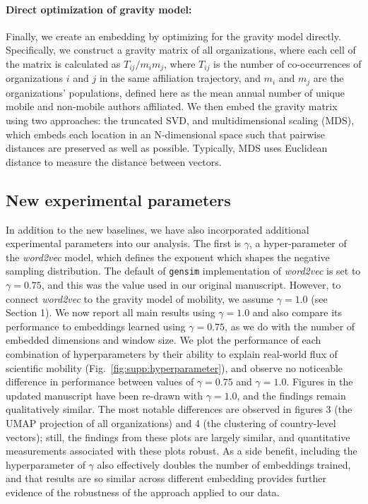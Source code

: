 \documentclass[12pt,a4paper]{article}
\begin{document}
\vspace{-0.3cm}
\paragraph{Direct optimization of gravity model:} Finally, we create an embedding by optimizing for the gravity model directly.
Specifically, we construct a gravity matrix of all organizations, where each cell of the matrix is calculated as $T_{ij}/m_i m_j$, where $T_{ij}$ is the number of co-occurrences of organizations $i$ and $j$ in the same affiliation trajectory, and $m_i$ and $m_j$ are the organizations' populations, defined here as the mean annual number of unique mobile and non-mobile authors affiliated. We then embed the gravity matrix using two approaches: the truncated SVD, and multidimensional scaling (MDS), which embeds each location in an N-dimensional space such that pairwise distances are preserved as well as possible.
Typically, MDS uses Euclidean distance to measure the distance between vectors.

\subsection{New experimental parameters}
In addition to the new baselines, we have also incorporated additional experimental parameters into our analysis.
The first is $\gamma$, a hyper-parameter of the \textit{word2vec} model, which defines the exponent which shapes the negative sampling distribution.
The default of \texttt{gensim} implementation of \textit{word2vec} is set to $\gamma = 0.75$, and this was the value used in our original manuscript.
However, to connect \textit{word2vec} to the gravity model of mobility, we assume $\gamma = 1.0$ (see Section 1).
We now report all main results using $\gamma = 1.0$ and also compare its performance to embeddings learned using $\gamma = 0.75$, as we do with the number of embedded dimensions and window size.
We plot the performance of each combination of hyperparameters by their ability to explain real-world flux of scientific mobility (Fig.~\ref{fig:supp:hyperparameter}), and observe no noticeable difference in performance between values of $\gamma = 0.75$ and $\gamma = 1.0$.
Figures in the updated manuscript have been re-drawn with $\gamma = 1.0$, and the findings remain qualitatively similar.
The most notable differences are observed in figures 3 (the UMAP projection of all organizations) and 4 (the clustering of country-level vectors);
still, the findings from these plots are largely similar, and quantitative measurements associated with these plots robust. 
As a side benefit, including the hyperparameter of $\gamma$ also effectively doubles the number of embeddings trained, and that results are so similar across different embedding provides further evidence of the robustness of the approach applied to our data.
\end{document}
